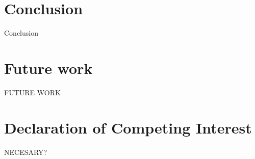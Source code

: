 \section{Conclusion} \label{Conclusion}
Conclusion
\section{Future work}
FUTURE WORK

\section{Declaration of Competing Interest}

NECESARY?

